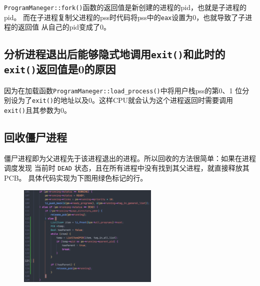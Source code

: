 \texttt{ProgramManeger::fork()}函数的返回值是新创建的进程的pid，也就是子进程的pid。
而在子进程复制父进程的pss时代码将pss中的\texttt{eax}设置为0，也就导致了子进程的返回值
从自己的pid变成了0。

\subsection{分析进程退出后能够隐式地调用\texttt{exit()}和此时的\texttt{exit()}返回值是0的原因}

因为在加载函数\texttt{ProgramManeger::load\_process()}中将用户栈pss的第0、1
位分别设为了\texttt{exit()}的地址以及0。这样CPU就会认为这个进程返回时需要调用
\texttt{exit()}且其参数为0。

\subsection{回收僵尸进程}

僵尸进程即为父进程先于该进程退出的进程。所以回收的方法很简单：如果在进程调度发现
当前时 \texttt{DEAD} 状态，且在所有进程中没有找到其父进程，就直接释放其PCB。
具体代码实现为下图用绿色标记的行。

\begin{figure}[H]
    \centering
    \includegraphics[width=0.6\textwidth]{figures/zombie.png}
    \label{zombie}
\end{figure}